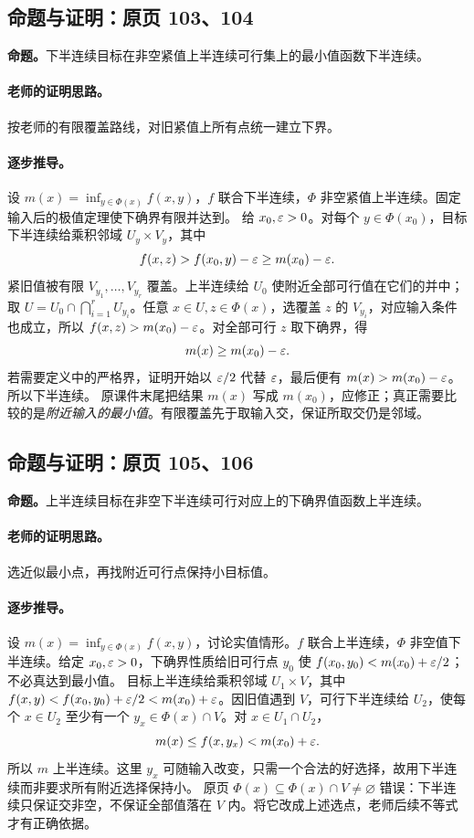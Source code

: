 \subsection{命题与证明：原页 103、104}

\textbf{命题。}下半连续目标在非空紧值上半连续可行集上的最小值函数下半连续。

\paragraph{老师的证明思路。}按老师的有限覆盖路线，对旧紧值上所有点统一建立下界。

\paragraph{逐步推导。}
设 $m(x)=\inf_{y\in\Phi(x)}f(x,y)$，$f$ 联合下半连续，$\Phi$ 非空紧值上半连续。固定输入后的极值定理使下确界有限并达到。
给 $x_0,\varepsilon>0$。对每个 $y\in\Phi(x_0)$，目标下半连续给乘积邻域 $U_y\times V_y$，其中
\[f(x,z)>f(x_0,y)-\varepsilon\ge m(x_0)-\varepsilon.\]
紧旧值被有限 $V_{y_1},\ldots,V_{y_r}$ 覆盖。上半连续给 $U_0$ 使附近全部可行值在它们的并中；取 $U=U_0\cap\bigcap_{i=1}^rU_{y_i}$。任意 $x\in U,z\in\Phi(x)$，选覆盖 $z$ 的 $V_{y_i}$，对应输入条件也成立，所以 $f(x,z)>m(x_0)-\varepsilon$。对全部可行 $z$ 取下确界，得
\[m(x)\ge m(x_0)-\varepsilon.\]
若需要定义中的严格界，证明开始以 $\varepsilon/2$ 代替 $\varepsilon$，最后便有 $m(x)>m(x_0)-\varepsilon$。所以下半连续。
原课件末尾把结果 $m(x)$ 写成 $m(x_0)$，应修正；真正需要比较的是\emph{附近输入的最小值}。有限覆盖先于取输入交，保证所取交仍是邻域。


\subsection{命题与证明：原页 105、106}

\textbf{命题。}上半连续目标在非空下半连续可行对应上的下确界值函数上半连续。

\paragraph{老师的证明思路。}选近似最小点，再找附近可行点保持小目标值。

\paragraph{逐步推导。}
设 $m(x)=\inf_{y\in\Phi(x)}f(x,y)$，讨论实值情形。$f$ 联合上半连续，$\Phi$ 非空值下半连续。给定 $x_0,\varepsilon>0$，下确界性质给旧可行点 $y_0$ 使 $f(x_0,y_0)<m(x_0)+\varepsilon/2$；不必真达到最小值。
目标上半连续给乘积邻域 $U_1\times V$，其中 $f(x,y)<f(x_0,y_0)+\varepsilon/2<m(x_0)+\varepsilon$。因旧值遇到 $V$，可行下半连续给 $U_2$，使每个 $x\in U_2$ 至少有一个 $y_x\in\Phi(x)\cap V$。对 $x\in U_1\cap U_2$，
\[m(x)\le f(x,y_x)<m(x_0)+\varepsilon.\]
所以 $m$ 上半连续。这里 $y_x$ 可随输入改变，只需一个合法的好选择，故用下半连续而非要求所有附近选择保持小。
原页 $\Phi(x)\subseteq\Phi(x)\cap V\ne\varnothing$ 错误：下半连续只保证交非空，不保证全部值落在 $V$ 内。将它改成上述选点，老师后续不等式才有正确依据。


